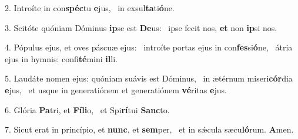 2. Introíte in con\textbf{spéc}tu \textbf{e}jus, \ast\  in exsul\textbf{ta}ti\textbf{ó}ne.\

3. Scitóte quóniam Dóminus \textbf{ip}se est \textbf{De}us: \ast\  ipse fecit nos, \textbf{et} non \textbf{ip}si nos.\

4. Pópulus ejus, et oves páscuæ ejus: \dag\  introíte portas ejus in con\textbf{fes}si\textbf{ó}ne, \ast\  átria ejus in hymnis: confi\textbf{té}mini \textbf{il}li.\

5. Laudáte nomen ejus: quóniam suávis est Dóminus, \dag\  in ætérnum miseri\textbf{cór}dia \textbf{e}jus, \ast\  et usque in generatiónem et generatiónem \textbf{vé}ritas \textbf{e}jus.\

6. Glória \textbf{Pa}tri, et \textbf{Fí}\textbf{li}o, \ast\  et Spi\textbf{rí}tui \textbf{Sanc}to.\

7. Sicut erat in princípio, et \textbf{nunc}, et \textbf{sem}per, \ast\  et in sǽcula sæcu\textbf{ló}rum. \textbf{A}men.\

